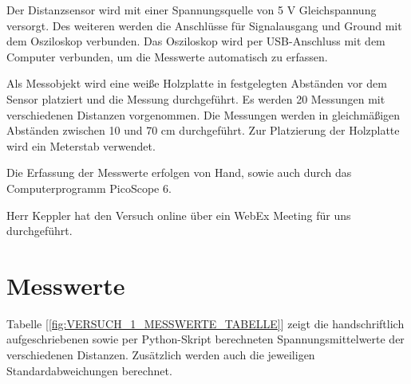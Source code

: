 \documentclass[12pt, oneside, a4paper, \docLanguage]{report}
\begin{document}
Der Distanzsensor wird mit einer Spannungsquelle von 5 V Gleichspannung versorgt. Des weiteren werden die Anschlüsse für Signalausgang und Ground mit dem Osziloskop verbunden. Das Osziloskop wird per USB-Anschluss mit dem Computer verbunden, um die Messwerte automatisch zu erfassen.

Als Messobjekt wird eine weiße Holzplatte in festgelegten Abständen vor dem Sensor platziert und die Messung durchgeführt. Es werden 20 Messungen mit verschiedenen Distanzen vorgenommen. Die Messungen werden in gleichmäßigen Abständen zwischen 10 und 70 cm durchgeführt. Zur Platzierung der Holzplatte wird ein Meterstab verwendet.

Die Erfassung der Messwerte erfolgen von Hand, sowie auch durch das Computerprogramm PicoScope 6.

Herr Keppler hat den Versuch online über ein WebEx Meeting für uns durchgeführt.
\section{Messwerte}
\label{chap:VERSUCH_1_MESSWERTE}
Tabelle [\ref{fig:VERSUCH_1_MESSWERTE_TABELLE}] zeigt die handschriftlich aufgeschriebenen sowie per Python-Skript berechneten Spannungsmittelwerte der verschiedenen Distanzen. Zusätzlich werden auch die jeweiligen Standardabweichungen berechnet.
\end{document}
